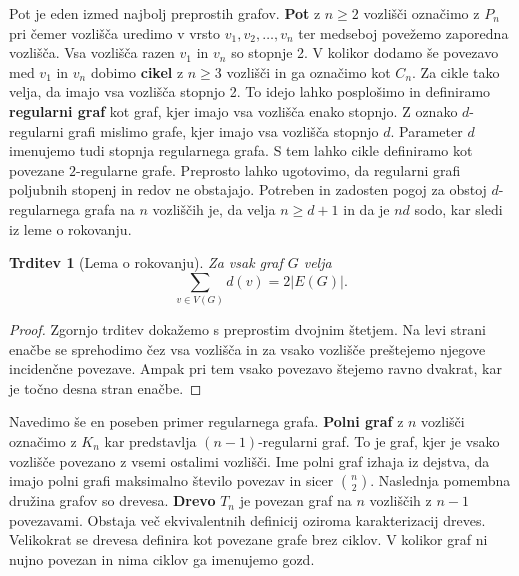 \documentclass[12pt,a4paper,twoside]{article}
\theoremstyle{definition} %
\theoremstyle{plain} %
\newtheorem{trditev}[definicija]{Trditev}
\numberwithin{equation}{section}  %
\begin{document}
Pot je eden izmed najbolj preprostih grafov. \textbf{Pot} z $n \ge 2$ vozlišči označimo z $P_n$ pri čemer vozlišča uredimo v vrsto $v_1, v_2, \ldots, v_n$ ter medseboj povežemo zaporedna vozlišča. Vsa vozlišča razen $v_1$ in $v_n$ so stopnje 2. V kolikor dodamo še povezavo med $v_1$ in $v_n$ dobimo \textbf{cikel} z $n \ge 3$ vozlišči in ga označimo kot $C_n$. Za cikle tako velja, da imajo vsa vozlišča stopnjo 2. To idejo lahko posplošimo in definiramo \textbf{regularni graf} kot graf, kjer imajo vsa vozlišča enako stopnjo. Z oznako $d$-regularni grafi mislimo grafe, kjer imajo vsa vozlišča stopnjo $d$. Parameter $d$ imenujemo tudi stopnja regularnega grafa. S tem lahko cikle definiramo kot povezane $2$-regularne grafe. Preprosto lahko ugotovimo, da regularni grafi poljubnih stopenj in redov ne obstajajo. Potreben in zadosten pogoj za obstoj $d$-regularnega grafa na $n$ vozliščih je, da velja $n \ge d + 1$ in da je $nd$ sodo, kar sledi iz leme o rokovanju.
\begin{trditev}[Lema o rokovanju]
Za vsak graf $G$ velja
$$ \sum_{v \in V(G)} d(v) = 2 |E(G)|. $$
\end{trditev}
\begin{proof}
Zgornjo trditev dokažemo s preprostim dvojnim štetjem. Na levi strani enačbe se sprehodimo čez vsa vozlišča in za vsako vozlišče preštejemo njegove incidenčne povezave.
Ampak pri tem vsako povezavo štejemo ravno dvakrat, kar je točno desna stran enačbe.
\end{proof}
 Navedimo še en poseben primer regularnega grafa. \textbf{Polni graf} z $n$ vozlišči označimo z $K_n$ kar predstavlja $(n-1)$-regularni graf. To je graf, kjer je vsako vozlišče povezano z vsemi ostalimi vozlišči. Ime polni graf izhaja iz dejstva, da imajo polni grafi maksimalno število povezav in sicer ${n \choose 2}$. Naslednja pomembna družina grafov so drevesa. \textbf{Drevo} $T_n$ je povezan graf na $n$ vozliščih z $n-1$ povezavami. Obstaja več ekvivalentnih definicij oziroma karakterizacij dreves. Velikokrat se drevesa definira kot povezane grafe brez ciklov. V kolikor graf ni nujno povezan in nima ciklov ga imenujemo gozd.
\end{document}
